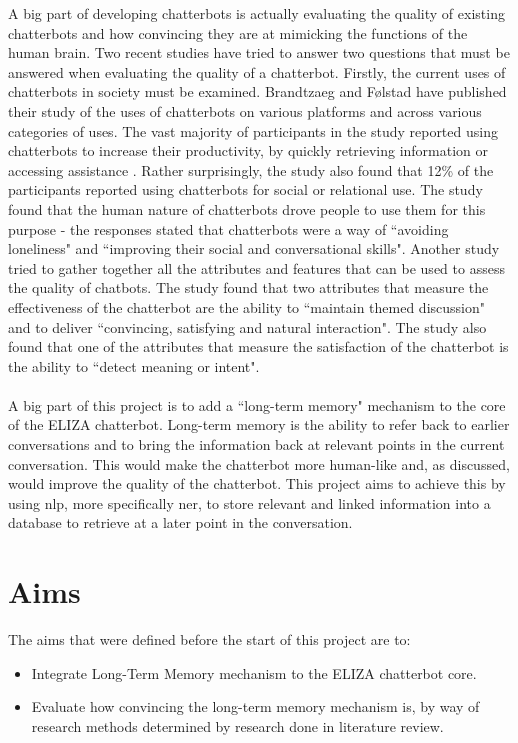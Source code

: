 A big part of developing chatterbots is actually evaluating the quality of existing chatterbots and how convincing they are at mimicking the functions of the human brain. Two recent studies have tried to answer two questions that must be answered when evaluating the quality of a chatterbot. Firstly, the current uses of chatterbots in society must be examined. Brandtzaeg and Følstad have published their study of the uses of chatterbots on various platforms and across various categories of uses. The vast majority of participants in the study reported using chatterbots to increase their productivity, by quickly retrieving information or accessing assistance \autocite{why-people-use-chatbots2017}. Rather surprisingly, the study also found that 12\% of the participants reported using chatterbots for social or relational use. The study found that the human nature of chatterbots drove people to use them for this purpose - the responses stated that chatterbots were a way of ``avoiding loneliness" and ``improving their social and conversational skills". Another study tried to gather together all the attributes and features that can be used to assess the quality of chatbots. \autocite{evaluating-chatbots2017} The study found that two attributes that measure the effectiveness of the chatterbot are the ability to ``maintain themed discussion" and to deliver ``convincing, satisfying and natural interaction". The study also found that one of the attributes that measure the satisfaction of the chatterbot is the ability to ``detect meaning or intent".\\\\
A big part of this project is to add a ``long-term memory" mechanism to the core of the ELIZA chatterbot. Long-term memory is the ability to refer back to earlier conversations and to bring the information back at relevant points in the current conversation. This would make the chatterbot more human-like and, as discussed, would improve the quality of the chatterbot. This project aims to achieve this by using \gls{nlp}, more specifically \gls{ner}, to store relevant and linked information into a database to retrieve at a later point in the conversation.

\section{Aims}
The aims that were defined before the start of this project are to:
\begin{itemize}
	\item Integrate Long-Term Memory mechanism to the ELIZA chatterbot core.
	\item Evaluate how convincing the long-term memory mechanism is, by way of research methods determined by research done in literature review.
\end{itemize}

